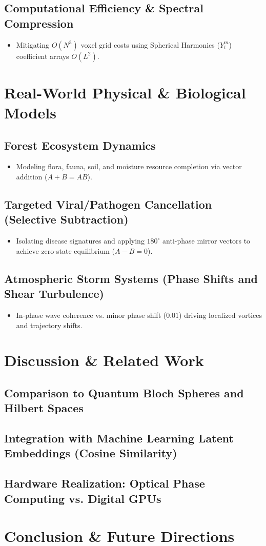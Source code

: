 \documentclass[12pt, a4paper]{article}
\begin{document}
\subsection{Computational Efficiency \& Spectral Compression}
\begin{itemize}
    \item Mitigating $O(N^3)$ voxel grid costs using Spherical Harmonics ($Y_l^m$) coefficient arrays $O(L^2)$.
\end{itemize}

\section{Real-World Physical \& Biological Models}
\subsection{Forest Ecosystem Dynamics}
\begin{itemize}
    \item Modeling flora, fauna, soil, and moisture resource completion via vector addition ($A + B = AB$).
\end{itemize}

\subsection{Targeted Viral/Pathogen Cancellation (Selective Subtraction)}
\begin{itemize}
    \item Isolating disease signatures and applying $180^\circ$ anti-phase mirror vectors to achieve zero-state equilibrium ($A - B = 0$).
\end{itemize}

\subsection{Atmospheric Storm Systems (Phase Shifts and Shear Turbulence)}
\begin{itemize}
    \item In-phase wave coherence vs. minor phase shift ($0.01$) driving localized vortices and trajectory shifts.
\end{itemize}

\section{Discussion \& Related Work}
\subsection{Comparison to Quantum Bloch Spheres and Hilbert Spaces}
\subsection{Integration with Machine Learning Latent Embeddings (Cosine Similarity)}
\subsection{Hardware Realization: Optical Phase Computing vs. Digital GPUs}

\section{Conclusion \& Future Directions}
\end{document}
